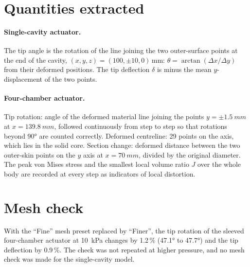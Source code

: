 \documentclass[12pt,a4paper,oneside]{report}
\numberwithin{equation}{chapter}
\numberwithin{figure}{chapter}
\numberwithin{table}{chapter}
\begin{document}
\section{Quantities extracted}
\paragraph{Single-cavity actuator.} The tip angle is the rotation of the line joining the two outer-surface
points at the end of the cavity, $(x,y,z)=(100,\pm10,0)$\,mm: $\theta=\arctan(\Delta x/\Delta y)$ from their
deformed positions. The tip deflection $\delta$ is minus the mean $y$-displacement of the two points.

\paragraph{Four-chamber actuator.} Tip rotation: angle of the deformed material line joining the points
$y=\pm\SI{1.5}{mm}$ at $x=\SI{139.8}{mm}$, followed continuously from step to step so that rotations beyond
\ang{90} are counted correctly. Deformed centreline: 29 points on the axis, which lies in the solid core.
Section change: deformed distance between the two outer-skin points on the $y$ axis at $x=\SI{70}{mm}$,
divided by the original diameter. The peak von Mises stress and the smallest local volume ratio $J$ over
the whole body are recorded at every step as indicators of local distortion.

\section{Mesh check}
With the ``Fine'' mesh preset replaced by ``Finer'', the tip rotation of the sleeved
four-chamber actuator at \SI{10}{kPa} changes by 1.2\,\% (\ang{47.1} to \ang{47.7}) and the tip deflection by
0.9\,\%. The check was not repeated at higher pressure, and no mesh check was made for the single-cavity
model.
\end{document}
